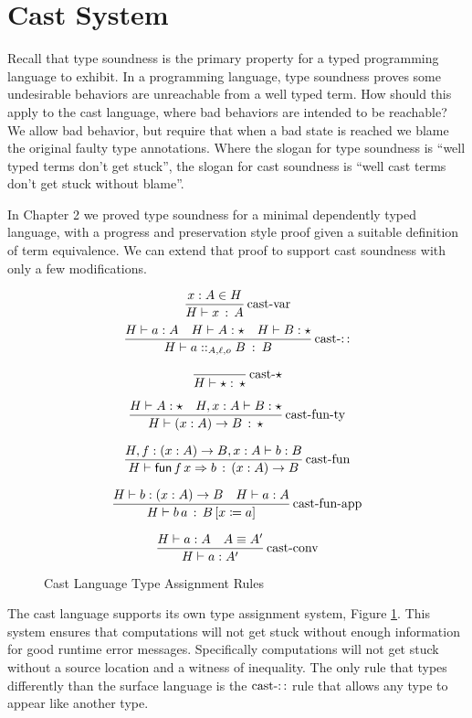 
\section{Cast System}


Recall that type soundness is the primary property for a typed programming
language to exhibit. In a programming language, type soundness proves
some undesirable behaviors are unreachable from a well typed term.
How should this apply to the cast language, where bad behaviors are
intended to be reachable? We allow bad behavior, but require that
when a bad state is reached we blame the original faulty type annotations.
Where the slogan for type soundness is ``well typed terms don't get
stuck'', the slogan for cast soundness is ``well cast terms don't
get stuck without blame''.

In Chapter 2 we proved type soundness for a minimal dependently typed
language, with a progress and preservation style proof given a suitable
definition of term equivalence. We can extend that proof to support
cast soundness with only a few modifications.

\begin{figure}
\[
\frac{x:A\in H}{H\vdash x\,:\,A}\operatorname{cast-var}
\]
\[
\frac{H\vdash a:A\quad H\vdash A:\star\quad H\vdash B:\star}{H\vdash a::_{A,\ell,o}B\::\:B}\operatorname{cast-::}
\]

\[
\frac{\,}{H\vdash\star:\,\star}\operatorname{cast-\star}
\]

\[
\frac{H\vdash A:\star\quad H,x:A\vdash B:\star}{H\vdash\left(x:A\right)\rightarrow B\,:\,\star}\operatorname{cast-fun-ty}
\]

\[
\frac{H,f:\left(x:A\right)\rightarrow B,x:A\vdash b:B}{H\vdash\mathsf{fun}\,f\,x\Rightarrow b\,:\,\left(x:A\right)\rightarrow B}\operatorname{cast-fun}
\]

\[
\frac{H\vdash b:\left(x:A\right)\rightarrow B\quad H\vdash a:A}{H\vdash b\,a\,:\,B\left[x\coloneqq a\right]}\operatorname{cast-fun-app}
\]

\[
\frac{H\vdash a:A\quad A\equiv A'}{H\vdash a:A'}\operatorname{cast-conv}
\]


\caption{Cast Language Type Assignment Rules}
\label{fig:cast-tas-rules}
\end{figure}

The cast language supports its own type assignment system, Figure
\ref{fig:cast-tas-rules}. This system ensures that computations will
not get stuck without enough information for good runtime error messages.
Specifically computations will not get stuck without a source location
and a witness of inequality. The only rule that types differently
than the surface language is the $\operatorname{cast-::}$ rule that
allows any type to appear like another type. 

